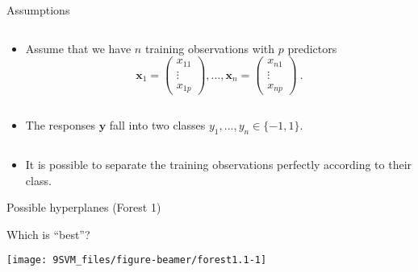 \documentclass[10pt,ignorenonframetext,]{beamer}
\providecommand{\tightlist}{%
  \setlength{\itemsep}{0pt}\setlength{\parskip}{0pt}}
\begin{document}
\begin{frame}

\begin{block}{Assumptions}

\(~\)

\begin{itemize}
\tightlist
\item
  Assume that we have \(n\) training observations with \(p\) predictors
  \[{\boldsymbol x}_1=\left(
    \begin{array}{c}
      x_{11} \\
      \vdots \\
      x_{1p}
      \end{array}
  \right), \ldots, {\boldsymbol x}_n=\left(
    \begin{array}{c}
      x_{n1} \\
      \vdots \\
      x_{np}
      \end{array}
  \right) \ .\]
\end{itemize}

\(~\)

\begin{itemize}
\tightlist
\item
  The responses \(\boldsymbol{y}\) fall into two classes
  \(y_1,...,y_n \in \{-1,1\}\).
\end{itemize}

\(~\)

\begin{itemize}
\tightlist
\item
  It is possible to separate the training observations perfectly
  according to their class.
\end{itemize}

\end{block}

\end{frame}

\begin{frame}

\begin{block}{Possible hyperplanes (Forest 1)}

\vspace{2mm}

Which is ``best''?

\begin{center}\texttt{[image: 9SVM\_files/figure-beamer/forest1.1-1]} \end{center}

\end{block}

\end{frame}
\end{document}
